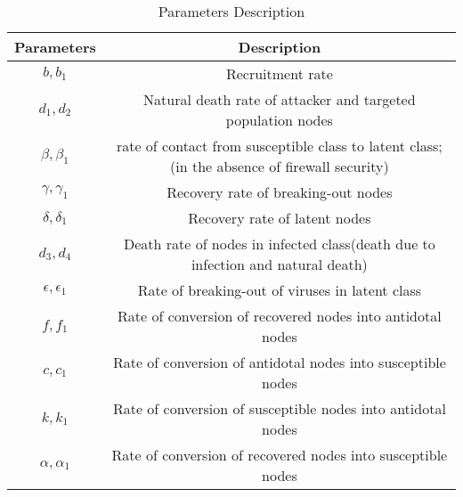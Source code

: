 \begin{table}
\caption{Parameters Description}
\begin{center}
\begin{tabular}{|c|c|}
  \hline
  \textbf{Parameters} & \textbf{Description }\\
  \hline
  $b,b_1$ & Recruitment rate\\
  \hline
  $d_1,d_2$ & Natural death rate of attacker and targeted population nodes\\
  \hline
  $\beta,\beta_1$ & rate of contact from susceptible class to latent class;(in the absence of firewall security) \\
  \hline
  $\gamma,\gamma_1$ & Recovery rate of breaking-out nodes \\
  \hline
  $\delta,\delta_1$ & Recovery rate of latent nodes\\
  \hline
  $d_3,d_4$ & Death rate of nodes in infected class(death due to infection and natural death) \\
  \hline
  $\epsilon,\epsilon_1$& Rate of breaking-out of viruses in latent class\\
  \hline
  $f,f_1$ & Rate of conversion of recovered nodes into antidotal nodes \\
  \hline
  $c,c_1$ & Rate of conversion of antidotal nodes into susceptible nodes \\
  \hline
  $k,k_1$ & Rate of conversion of susceptible nodes into antidotal nodes \\
  \hline
  $\alpha,\alpha_1$ & Rate of conversion of recovered nodes into susceptible nodes \\
  \hline
\end{tabular}  \label{table1}
\end{center}
\end{table}